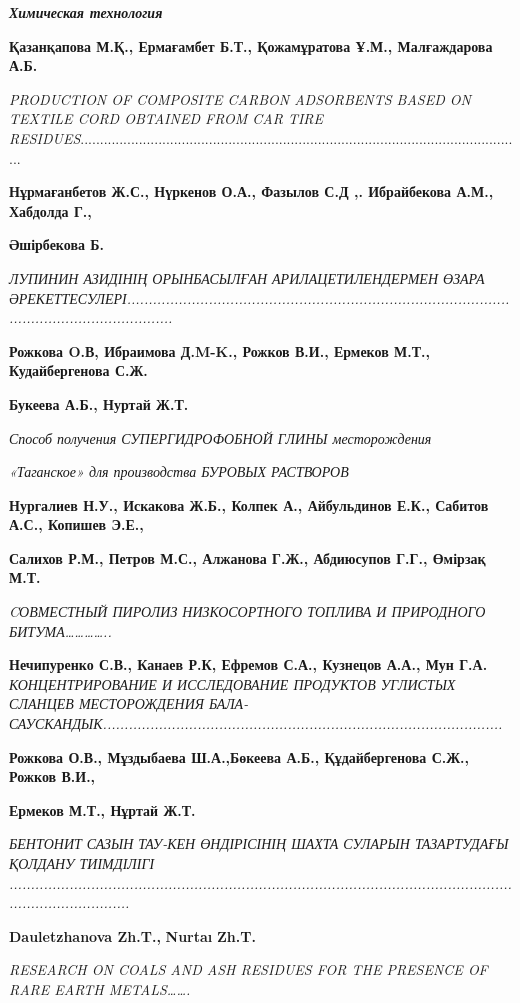 \emph{\textbf{Химическая технология}}

\textbf{Қазанқапова М.Қ., Ермағамбет Б.Т., Қожамұратова Ұ.М.,
Малғаждарова А.Б.}

\emph{PRODUCTION OF COMPOSITE CARBON ADSORBENTS BASED ON TEXTILE CORD
OBTAINED FROM CAR TIRE
RESIDUES}..................................................................................................................

\textbf{Нұрмағанбетов Ж.С., Нүркенов О.А., Фазылов С.Д ,. Ибрайбекова
А.М., Хабдолда Г.,}

\textbf{Әшірбекова Б.}

\emph{ЛУПИНИН АЗИДІНІҢ ОРЫНБАСЫЛҒАН АРИЛАЦЕТИЛЕНДЕРМЕН ӨЗАРА
ӘРЕКЕТТЕСУЛЕРІ...............................................................................................................................}

\textbf{Рожкова O.В, Ибраимова Д.M-K., Рожков В.И., Ермеков М.Т.,
Кудайбергенова С.Ж.}

\textbf{Букеева А.Б., Нуртай Ж.Т.}

\emph{Способ получения СУПЕРГИДРОФОБНОЙ ГЛИНЫ месторождения}

\emph{«Таганское» для производства БУРОВЫХ РАСТВОРОВ}

\textbf{Нургалиев Н.У., Искакова Ж.Б., Колпек А., Айбульдинов Е.К.,
Сабитов А.С., Копишев Э.Е.,}

\textbf{Салихов Р.М., Петров М.С., Алжанова Г.Ж., Абдиюсупов Г.Г.,
Өмірзақ М.Т.}

\emph{CОВМЕСТНЫЙ ПИРОЛИЗ НИЗКОСОРТНОГО ТОПЛИВА И ПРИРОДНОГО
БИТУМА\ldots\ldots\ldots\ldots..}

\textbf{Нечипуренко С.В., Канаев Р.К, Ефремов С.А., Кузнецов А.А., Мун
Г.А.} \emph{КОНЦЕНТРИРОВАНИЕ И ИССЛЕДОВАНИЕ ПРОДУКТОВ УГЛИСТЫХ СЛАНЦЕВ
МЕСТОРОЖДЕНИЯ
БАЛА-САУСКАНДЫК.............................................................................................}

\textbf{Рожкова О.В., Мұздыбаева Ш.А.,Бөкеева А.Б., Құдайбергенова С.Ж.,
Рожков В.И.,}

\textbf{Ермеков М.Т., Нұртай Ж.Т.}

\emph{БЕНТОНИТ САЗЫН ТАУ-КЕН ӨНДІРІСІНІҢ ШАХТА СУЛАРЫН ТАЗАРТУДАҒЫ
ҚОЛДАНУ ТИІМДІЛІГІ
.................................................................................................................................................}

\textbf{Dauletzhanova Zh.T.,} \textbf{Nurtaı} \textbf{Zh.T.}

\emph{RESEARCH ON COALS AND ASH RESIDUES FOR THE PRESENCE OF RARE EARTH
METALS\ldots\ldots.}

